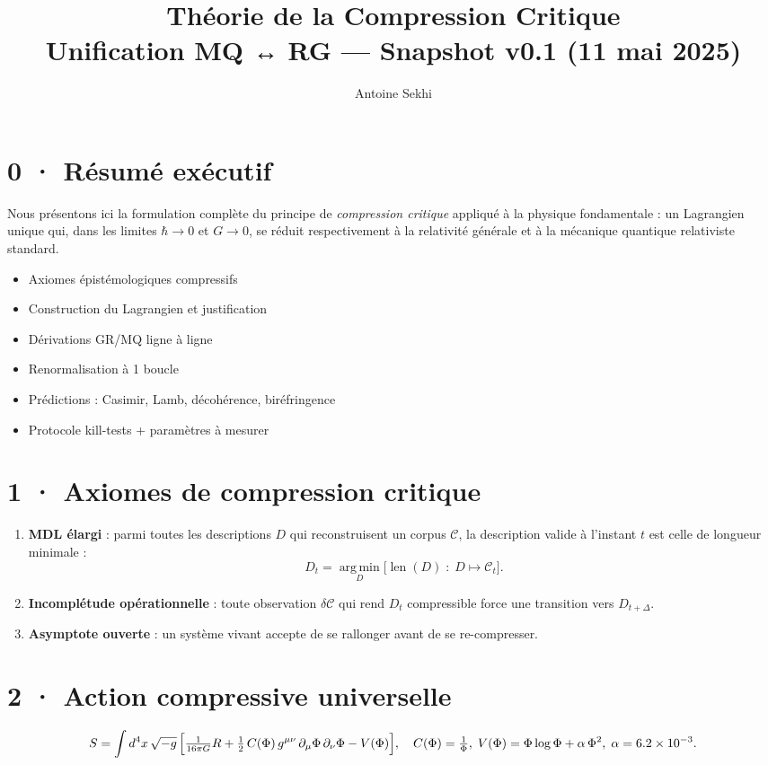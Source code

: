 \documentclass[11pt]{article}
\title{\textbf{Théorie de la Compression Critique}\\
       \large Unification MQ ↔ RG — Snapshot v0.1 (11 mai 2025)}
\author{Antoine Sekhi}
\date{}
\begin{document}
\maketitle
\thispagestyle{empty}

\section*{0 · Résumé exécutif}
Nous présentons ici la formulation complète du principe de \emph{compression critique} appliqué à la physique fondamentale : un Lagrangien unique qui, dans les limites $\hbar\to0$ et $G\to0$, se réduit respectivement à la relativité générale et à la mécanique quantique relativiste standard.

\begin{itemize}
  \item Axiomes épistémologiques compressifs
  \item Construction du Lagrangien et justification
  \item Dérivations GR/MQ ligne à ligne
  \item Renormalisation à 1 boucle
  \item Prédictions : Casimir, Lamb, décohérence, biréfringence
  \item Protocole kill-tests + paramètres à mesurer
\end{itemize}

\section{1 · Axiomes de compression critique}
\begin{enumerate}
  \item \textbf{MDL élargi} : parmi toutes les descriptions $D$ qui reconstruisent un corpus $\mathcal{C}$, la description valide à l’instant $t$ est celle de longueur minimale :
    \[
      D_t = \operatorname*{arg\,min}_{D}
            \bigl[\operatorname{len}(D)\;:\;D\mapsto\mathcal{C}_t\bigr].
    \]
  \item \textbf{Incomplétude opérationnelle} : toute observation $\delta\mathcal{C}$ qui rend $D_t$ compressible force une transition vers $D_{t+\Delta}$.
  \item \textbf{Asymptote ouverte} : un système vivant accepte de se rallonger avant de se re-compresser.
\end{enumerate}

\section{2 · Action compressive universelle}
\[
  S = \int d^4x\,\sqrt{-g}\,
      \Bigl[\tfrac{1}{16\pi G}R
           + \tfrac12\,C(\Phi)\,g^{\mu\nu}\,\partial_\mu\Phi\,\partial_\nu\Phi
           - V(\Phi)\Bigr],
\quad
  C(\Phi)=\tfrac1\Phi,\;
  V(\Phi)=\Phi\log\Phi+\alpha\,\Phi^2,\;
  \alpha=6.2\times10^{-3}.
\]
\end{document}
